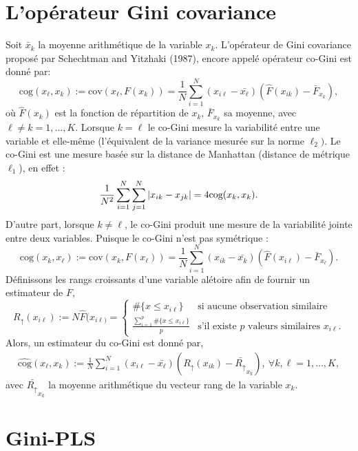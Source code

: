 \documentclass[a4paper, 12pt]{article}
\newcommand{\cov}{\text{cov}}
\newcommand{\cog}{\text{cog}}
\numberwithin{equation}{section}
\begin{document}
\section{L'opérateur Gini covariance}

Soit $\bar{x}_k$ la moyenne arithmétique de la variable $x_k$. L'opérateur de Gini covariance proposé par Schechtman and Yitzhaki (1987), encore appelé opérateur co-Gini est donné par:
\begin{equation}\label{cog0}
\cog(x_\ell,x_k) := \cov(x_\ell,F(x_k)) = \frac{1}{N}\sum_{i=1}^N(x_{i\ell} -\bar{x_\ell})(\hat{F}(x_{ik})-\bar{F}_{x_k}),
\end{equation}
où $\hat{F}(x_{k})$ est la fonction de répartition de $x_k$, $\bar{F}_{x_k}$ sa moyenne, avec $\ell \neq k = 1,\ldots,K$. Lorsque $k=\ell$ le co-Gini mesure la variabilité entre une variable et elle-même (l'équivalent de la variance mesurée sur la norme $\ell_2)$. Le co-Gini est une mesure basée sur la distance de Manhattan (distance de métrique $\ell_1$), en effet :
\begin{equation}\notag
\frac{1}{N^2}\sum_{i=1}^N\sum_{j=1}^N |x_{ik} - x_{jk}| = 4\cog(x_k,x_k).
\end{equation}
D'autre part, lorsque $k\neq \ell$, le co-Gini produit une mesure de la variabilité jointe entre deux variables. Puisque le co-Gini n'est pas symétrique :
\[
\cog(x_k,x_\ell) := \cov(x_k ,F(x_\ell)) = \frac{1}{N}\sum_{i=1}^N(x_{ik} -\bar{x_k})(\hat{F}(x_{i\ell})-\bar{F}_{x_\ell}).
\]
Définissons les rangs croissants d'une variable alétoire afin de fournir un estimateur de $F$,
\[
R_\uparrow(x_{i\ell}) := N\hat{F}(x_{i\ell)} = 
\left\{ \begin{array}{ll}
\#\{ x \leq x_{i\ell} \} & \text{si aucune observation similaire} \\
\frac{\sum_{i=1}^p\#\{ x \leq x_{i\ell}  \}}{p} & \text{s'il existe $p$ valeurs similaires $x_{i\ell}$.}
\end{array}
\right.
\]
Alors, un estimateur du co-Gini est donné par,
\begin{eqnarray}\label{cog}
\widehat{\cog}(x_\ell,x_k) := \frac{1}{N}\sum_{i=1}^N(x_{i\ell} -\bar{x_\ell})(R_\uparrow(x_{ik})-\bar{R_\uparrow}_{x_k}), \ \forall k,\ell=1,\ldots,K,
\end{eqnarray}
avec $\bar{R_\uparrow}_{x_k}$ la moyenne arithmétique du vecteur rang de la variable $x_k$. 


\section{Gini-PLS}
 
\end{document}

